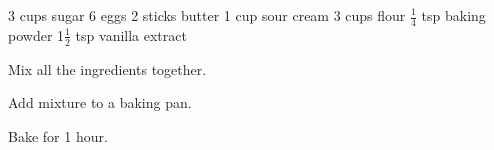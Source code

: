 \dishtype{\dessert}
\dishother{\vegetarian}
\begin{ingreds}
    3 cups sugar
    6 eggs
    2 sticks butter
    1 cup sour cream
    3 cups flour
    $\frac{1}{4}$ tsp baking powder
    1$\frac{1}{2}$ tsp vanilla extract
\end{ingreds}
\begin{method}
    Mix all the ingredients together.\par
    Add mixture to a baking pan.\par
    Bake for 1 hour.
\end{method}